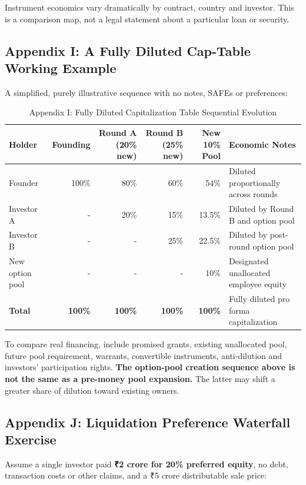 Instrument economics vary dramatically by contract, country and investor. This is a comparison map, not a legal statement about a particular loan or security.

\subsection{Appendix I: A Fully Diluted Cap-Table Working Example}

A simplified, purely illustrative sequence with no notes, SAFEs or preferences:

\begin{table}[t]
\centering
\small
\caption{Appendix I: Fully Diluted Capitalization Table Sequential Evolution}
\label{tab:app_i_captable}
\begin{tabularx}{\textwidth}{p{3.2cm} r r r r X}
\toprule
\textbf{Holder} & \textbf{Founding} & \textbf{Round A (20\% new)} & \textbf{Round B (25\% new)} & \textbf{New 10\% Pool} & \textbf{Economic Notes} \\
\midrule
Founder & 100\% & 80\% & 60\% & 54\% & Diluted proportionally across rounds \\
Investor A & - & 20\% & 15\% & 13.5\% & Diluted by Round B and option pool \\
Investor B & - & - & 25\% & 22.5\% & Diluted by post-round option pool \\
New option pool & - & - & - & 10\% & Designated unallocated employee equity \\
\midrule
\textbf{Total} & \textbf{100\%} & \textbf{100\%} & \textbf{100\%} & \textbf{100\%} & Fully diluted pro forma capitalization \\
\bottomrule
\end{tabularx}
\end{table}

To compare real financing, include promised grants, existing unallocated pool, future pool requirement, warrants, convertible instruments, anti-dilution and investors' participation rights. \textbf{The option-pool creation sequence above is not the same as a pre-money pool expansion.} The latter may shift a greater share of dilution toward existing owners.

\subsection{Appendix J: Liquidation Preference Waterfall Exercise}

Assume a single investor paid \textbf{\textnormal{₹}2 crore for 20\% preferred equity}, no debt, transaction costs or other claims, and a \textnormal{₹}5 crore distributable sale price:

